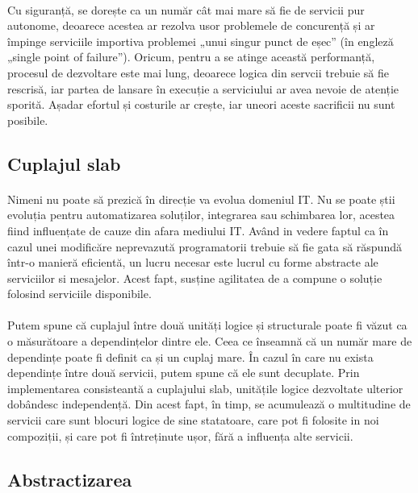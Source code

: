 \documentclass[12pt]{report}
\begin{document}
    \paragraph{}Cu siguranță, se dorește ca un număr cât mai mare să fie de servicii pur autonome, deoarece acestea ar rezolva usor problemele de concurență și ar împinge serviciile importiva problemei „unui singur punct de eșec” (în engleză „single point of failure”). Oricum, pentru a se atinge această performanță, procesul de dezvoltare este mai lung, deoarece logica din servcii trebuie să fie rescrisă, iar partea de lansare în execuție a serviciului ar avea nevoie de atenție sporită. Așadar efortul și costurile ar crește, iar uneori aceste sacrificii nu sunt posibile.
  	\subsection{Cuplajul slab}
  	\paragraph{}Nimeni nu poate să prezică în direcție va evolua domeniul IT. Nu se poate știi evoluția pentru automatizarea soluților, integrarea sau schimbarea lor, acestea fiind influențate de cauze din afara mediului IT. Având in vedere faptul ca în cazul unei modificăre neprevazută programatorii trebuie să fie gata să răspundă într-o manieră eficientă, un lucru necesar este lucrul cu forme abstracte ale serviciilor si mesajelor. Acest fapt, susține agilitatea de a compune o soluție folosind serviciile disponibile. \cite{erl2}
  	\paragraph{}Putem spune că cuplajul între două unități logice și structurale poate fi văzut ca o măsurătoare a dependințelor dintre ele. Ceea ce înseamnă că un număr mare de dependințe poate fi definit ca și un cuplaj mare. În cazul în care nu exista dependințe între două servicii, putem spune că ele sunt decuplate. Prin implementarea consisteantă a cuplajului slab, unitățile logice dezvoltate ulterior dobândesc independență. Din acest fapt, în timp, se acumulează o multitudine de servicii care sunt blocuri logice de sine statatoare, care pot fi folosite in noi compoziții, și care pot fi întreținute ușor, fără a influența alte servicii.\cite{erl2}
  	\subsection{Abstractizarea}
\end{document}
